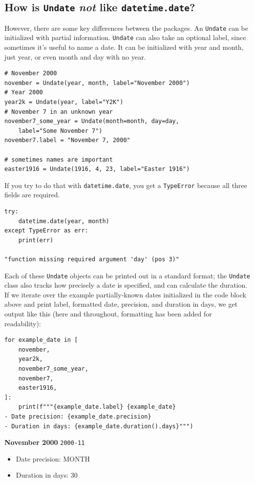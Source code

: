 \documentclass[final]{anthology-ch} %
\begin{document}
\subsection{How is \texttt{Undate} \textit{not} like \texttt{datetime.date}?}

However, there are some key differences between the packages. An \texttt{Undate} can be initialized with partial information.  \texttt{Undate} can also take an optional label, since sometimes it's useful to name a date.  It can be initialized with year and month, just year, or even month and day with no year.

\begin{verbatim}
# November 2000
november = Undate(year, month, label="November 2000")
# Year 2000
year2k = Undate(year, label="Y2K")
# November 7 in an unknown year
november7_some_year = Undate(month=month, day=day, 
    label="Some November 7")
november7.label = "November 7, 2000"

# sometimes names are important
easter1916 = Undate(1916, 4, 23, label="Easter 1916")
\end{verbatim}

If you try to do that with \texttt{datetime.date}, you get a \texttt{TypeError} because all three fields are required.

\begin{verbatim}
try:
    datetime.date(year, month)
except TypeError as err:
    print(err)

"function missing required argument 'day' (pos 3)"
\end{verbatim}

Each of these \texttt{Undate} objects can be printed out in a standard format; the \texttt{Undate} class also tracks how precisely a date is specified, and can calculate the duration.  If we iterate over the example partially-known dates initialized in the code block above and print label, formatted date, precision, and duration in days, we get output like this (here and throughout, formatting has been added for readability):

\begin{verbatim}
for example_date in [
    november,
    year2k,
    november7_some_year,
    november7,
    easter1916,
]:
    print(f"""{example_date.label} {example_date}
- Date precision: {example_date.precision}
- Duration in days: {example_date.duration().days}""")
\end{verbatim}

\noindent
\textbf{November 2000} \texttt{2000-11}
\begin{itemize}
    \item Date precision: MONTH
    \item Duration in days: 30
\end{itemize}
\end{document}
